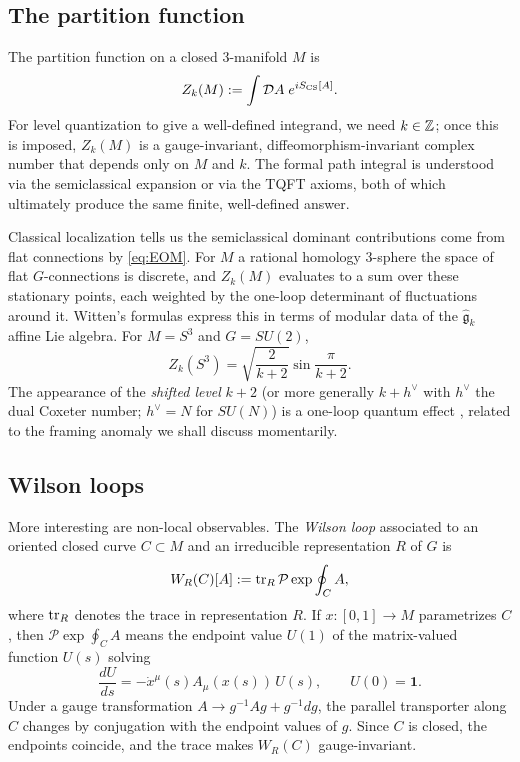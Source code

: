 \subsection{The partition function}

The partition function on a closed 3-manifold $M$ is
\begin{equation}\label{eq:Z-CS}
Z_k(M) := \int \mathcal{D}A\; e^{iS_{\operatorname{CS}}[A]}.
\end{equation}
For level quantization to give a well-defined integrand, we need $k\in \mathbb{Z}$; once this is imposed, $Z_k(M)$ is a gauge-invariant, diffeomorphism-invariant complex number that depends only on $M$ and $k$. The formal path integral is understood via the semiclassical expansion or via the TQFT axioms, both of which ultimately produce the same finite, well-defined answer.

\medskip

\noindent Classical localization tells us the semiclassical dominant contributions come from flat connections by \eqref{eq:EOM}. For $M$ a rational homology 3-sphere the space of flat $G$-connections is discrete, and $Z_k(M)$ evaluates to a sum over these stationary points, each weighted by the one-loop determinant of fluctuations around it. Witten's formulas \cite{Witten1989Jones} express this in terms of modular data of the $\widehat{\mathfrak{g}}_k$ affine Lie algebra. For $M = S^3$ and $G = SU(2)$,
\begin{equation}\label{eq:Z-S3}
Z_k(S^3) = \sqrt{\frac{2}{k+2}}\sin\frac{\pi}{k+2}.
\end{equation}
The appearance of the \emph{shifted level} $k+2$ (or more generally $k+h^\vee$ with $h^\vee$ the dual Coxeter number; $h^\vee = N$ for $SU(N)$) is a one-loop quantum effect \cite{Witten1989Jones, ElitzurMooreSchwimmerSeiberg1989}, related to the framing anomaly we shall discuss momentarily.

\subsection{Wilson loops}

More interesting are non-local observables. The \emph{Wilson loop} associated to an oriented closed curve $C\subset M$ and an irreducible representation $R$ of $G$ is
\begin{equation}\label{eq:Wilson}
W_R(C)[A] := \operatorname{tr}_R \mathcal{P}\exp\oint_C A,
\end{equation}
where $\operatorname{tr}_R$ denotes the trace in representation $R$. If $x:[0,1]\to M$ parametrizes $C$, then $\mathcal{P}\exp\oint_C A$ means the endpoint value $U(1)$ of the matrix-valued function $U(s)$ solving
\begin{equation*}
\frac{dU}{ds} = -\dot x^\mu(s)A_\mu(x(s))\,U(s),
\qquad
U(0)=\mathbf{1}.
\end{equation*}
Under a gauge transformation $A\to g^{-1}Ag + g^{-1}dg$, the parallel transporter along $C$ changes by conjugation with the endpoint values of $g$. Since $C$ is closed, the endpoints coincide, and the trace makes $W_R(C)$ gauge-invariant.

